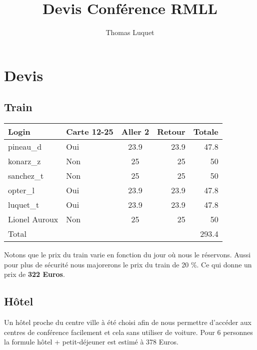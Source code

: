\documentclass{rtxreport}
\author{Thomas Luquet}
\title{Devis Conférence RMLL}
\begin{document}
\maketitle

\tableofcontents

\chapter{Devis}

\section{Train}

\begin{tabular}{|l|l|c|r|r|}
  \hline
  Login &  Carte 12-25 & Aller 2 & Retour & Totale \\
  \hline
  pineau\_d & Oui & 23.9 & 23.9 & 47.8 \\
  konarz\_z & Non & 25 & 25 & 50 \\
  sanchez\_t & Non & 25 & 25 & 50 \\
  opter\_l & Oui & 23.9 & 23.9 & 47.8 \\
  luquet\_t & Oui & 23.9 & 23.9 & 47.8 \\
  Lionel Auroux & Non & 25 & 25 & 50  \\
  Total & & & & 293.4 \\
  \hline

\end{tabular}

Notons que le prix du train varie en fonction du jour où nous le réservons.
Aussi pour plus de sécurité nous majorerons le prix du train de 20 \%.  Ce qui
donne un prix de {\bf 322 Euros}.


\section{Hôtel}

Un hôtel proche du centre ville à été choisi afin de nous permettre d'accéder
aux centres de conférence facilement et cela sans utiliser de voiture.
Pour 6 personnes la formule hôtel + petit-déjeuner est estimé à 378 Euros.
\end{document}
